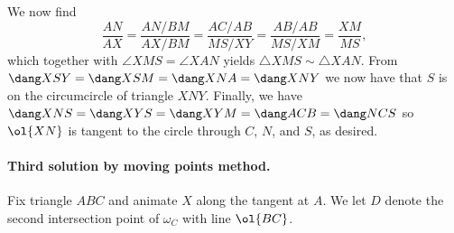 \documentclass[11pt]{scrartcl}
\begin{document}
We now find
\[
\frac{AN}{AX} = \frac{AN/BM}{AX/BM} = \frac{AC/AB}{MS/XY} = \frac{AB/AB}{MS/XM} = \frac{XM}{MS},
\]
which together with $\angle XMS = \angle XAN$ yields
$\triangle XMS \sim \triangle XAN$.
From $\dang XSY = \dang XSM = \dang XNA = \dang XNY$
we now have that $S$ is on the circumcircle of triangle $XNY$.
Finally, we have $\dang XNS = \dang XYS = \dang XYM = \dang ACB = \dang NCS$
so $\ol{XN}$ is tangent to the circle through $C$, $N$, and $S$, as desired.

\paragraph{Third solution by moving points method.}
Fix triangle $ABC$ and animate $X$ along the tangent at $A$.
We let $D$ denote the second intersection point of $\omega_C$
with line $\ol{BC}$.
\end{document}
